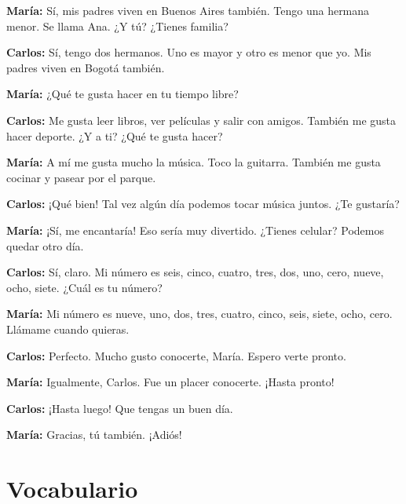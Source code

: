 \documentclass[12pt,a4paper]{article}
\begin{document}
\textbf{María:} Sí, mis padres viven en Buenos Aires también. Tengo una hermana menor. Se llama Ana. ¿Y tú? ¿Tienes familia?

\textbf{Carlos:} Sí, tengo dos hermanos. Uno es mayor y otro es menor que yo. Mis padres viven en Bogotá también.

\textbf{María:} ¿Qué te gusta hacer en tu tiempo libre?

\textbf{Carlos:} Me gusta leer libros, ver películas y salir con amigos. También me gusta hacer deporte. ¿Y a ti? ¿Qué te gusta hacer?

\textbf{María:} A mí me gusta mucho la música. Toco la guitarra. También me gusta cocinar y pasear por el parque.

\textbf{Carlos:} ¡Qué bien! Tal vez algún día podemos tocar música juntos. ¿Te gustaría?

\textbf{María:} ¡Sí, me encantaría! Eso sería muy divertido. ¿Tienes celular? Podemos quedar otro día.

\textbf{Carlos:} Sí, claro. Mi número es seis, cinco, cuatro, tres, dos, uno, cero, nueve, ocho, siete. ¿Cuál es tu número?

\textbf{María:} Mi número es nueve, uno, dos, tres, cuatro, cinco, seis, siete, ocho, cero. Llámame cuando quieras.

\textbf{Carlos:} Perfecto. Mucho gusto conocerte, María. Espero verte pronto.

\textbf{María:} Igualmente, Carlos. Fue un placer conocerte. ¡Hasta pronto!

\textbf{Carlos:} ¡Hasta luego! Que tengas un buen día.

\textbf{María:} Gracias, tú también. ¡Adiós!

\newpage

\section*{Vocabulario}
\end{document}
